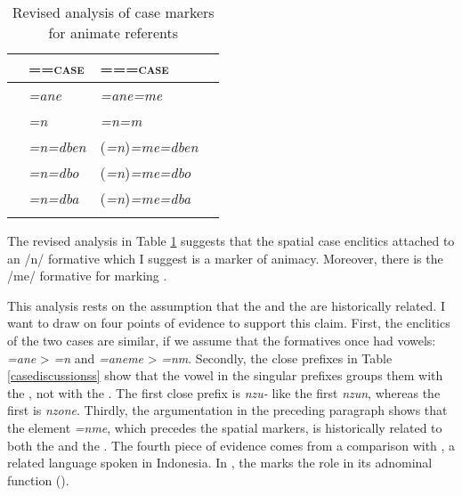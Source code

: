 \begin{table}[H]
\begin{center}
\caption{Revised analysis of case markers for animate referents} 
\label{casediscussionshist} 
	\begin{tabularx}{\textwidth}{Xlll}	
		\lsptoprule
		&=\Anim=\textsc{case}&=\Anim=\Nsg{}=\textsc{case}\\ \midrule
		\Poss{}&\emph{=ane}&\emph{=ane=me}\\ 
		\Dat{}&\emph{=n}&\emph{=n=m}\\ 
		\Loc{}&\emph{=n=dben}&(\emph{=n})\emph{=me=dben}\\ 
		\All{}&\emph{=n=dbo}&(\emph{=n})\emph{=me=dbo}\\ 
		\Abl{}&\emph{=n=dba}&(\emph{=n})\emph{=me=dba}\\ 
		\lspbottomrule
	\end{tabularx}
\end{center}
\end{table}%

The revised analysis in Table \ref{casediscussionshist} suggests that the spatial case enclitics attached to an /n/  formative which I suggest is a marker of animacy. Moreover, there is the /me/ formative for marking  .%

This analysis rests on the assumption that the  and the  are historically related. I want to draw on four points of evidence to support this claim. First, the enclitics of the two cases are similar, if we assume that the  formatives once had vowels: \emph{=ane} > \emph{=n} and \emph{=aneme} > \emph{=nm}. Secondly, the close  prefixes in Table \ref{casediscussionss} show that the vowel in the singular prefixes groups them with the , not with the . The first  close  prefix is \emph{nzu-} like the first    \emph{nzun}, whereas the first    is \emph{nzone}. Thirdly, the argumentation in the preceding paragraph shows that the element \emph{=nme}, which precedes the spatial  markers, is historically related to both the  and the . The fourth piece of evidence comes from a comparison with , a related  language spoken in Indonesia. In , the  marks the  role in its adnominal function (\citealt{Carroll:Ngkolmpu}).%

